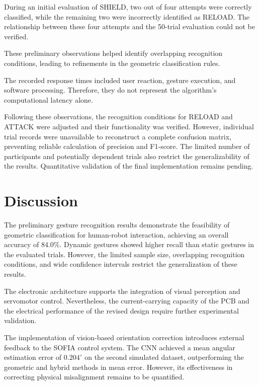 \documentclass[lettersize,journal]{IEEEtran}
\begin{document}
	During an initial evaluation of
	SHIELD, two out of four attempts were correctly classified,
	while the remaining two were incorrectly identified as RELOAD.
	The relationship between these four attempts and the 50-trial
	evaluation could not be verified.

	These preliminary observations
	helped identify overlapping recognition conditions, leading
	to refinements in the geometric classification rules.

	The recorded response times
	included user reaction, gesture execution, and software
	processing. Therefore, they do not represent the algorithm's
	computational latency alone.

	Following these observations,
	the recognition conditions for RELOAD and ATTACK were adjusted
	and their functionality was verified. However, individual
	trial records were unavailable to reconstruct a complete
	confusion matrix, preventing reliable calculation of
	precision and F1-score. The limited number of participants
	and potentially dependent trials also restrict the
	generalizability of the results. Quantitative validation
	of the final implementation remains pending.

		
	\section{Discussion}
	\label{sec:discussion}

	The preliminary gesture recognition results demonstrate the
	feasibility of geometric classification for human-robot
	interaction, achieving an overall accuracy of 84.0\%.
	Dynamic gestures showed higher recall than static gestures
	in the evaluated trials. However, the limited sample size,
	overlapping recognition conditions, and wide confidence
	intervals restrict the generalization of these results.

	The electronic architecture supports the integration of
	visual perception and servomotor control. Nevertheless,
	the current-carrying capacity of the PCB and the electrical
	performance of the revised design require further
	experimental validation.

	The implementation of vision-based orientation correction
	introduces external feedback to the SOFIA control system.
	The CNN achieved a mean angular estimation error of
	$0.204^\circ$ on the second simulated dataset, outperforming
	the geometric and hybrid methods in mean error. However,
	its effectiveness in correcting physical misalignment remains to be quantified.
\end{document}

